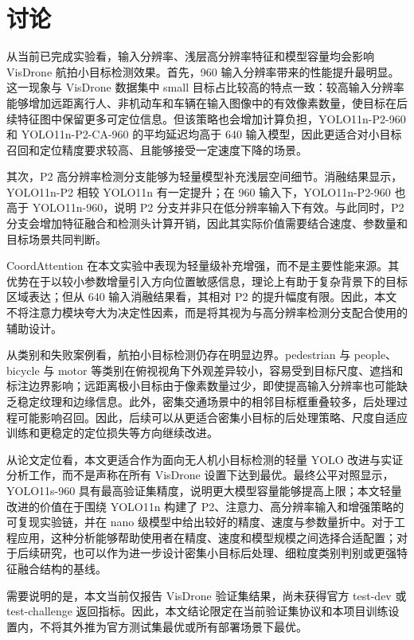 \documentclass[UTF8,a4paper,10.5pt,fontset=windows]{ctexart}
\newcommand{\YOLOBase}{\mbox{YOLO11n}}
\newcommand{\YOLOPtwo}{\mbox{YOLO11n-P2}}
\newcommand{\YOLOPtwoNine}{\mbox{YOLO11n-P2-960}}
\newcommand{\YOLOPtwoCANine}{\mbox{YOLO11n-P2-CA-960}}
\newcommand{\YOLOElevenS}{\mbox{YOLO11s}}
\newcommand{\CoordAtt}{\mbox{CoordAttention}}
\begin{document}
\FloatBarrier

\section{讨论}

从当前已完成实验看，输入分辨率、浅层高分辨率特征和模型容量均会影响 VisDrone 航拍小目标检测效果。首先，960 输入分辨率带来的性能提升最明显。这一现象与 VisDrone 数据集中 small 目标占比较高的特点一致：较高输入分辨率能够增加远距离行人、非机动车和车辆在输入图像中的有效像素数量，使目标在后续特征图中保留更多可定位信息。但该策略也会增加计算负担，\YOLOPtwoNine{} 和 \YOLOPtwoCANine{} 的平均延迟均高于 640 输入模型，因此更适合对小目标召回和定位精度要求较高、且能够接受一定速度下降的场景。

其次，P2 高分辨率检测分支能够为轻量模型补充浅层空间细节。消融结果显示，\YOLOPtwo{} 相较 \YOLOBase{} 有一定提升；在 960 输入下，\YOLOPtwoNine{} 也高于 \YOLOBase{}-960，说明 P2 分支并非只在低分辨率输入下有效。与此同时，P2 分支会增加特征融合和检测头计算开销，因此其实际价值需要结合速度、参数量和目标场景共同判断。

\CoordAtt{} 在本文实验中表现为轻量级补充增强，而不是主要性能来源。其优势在于以较小参数增量引入方向位置敏感信息，理论上有助于复杂背景下的目标区域表达；但从 640 输入消融结果看，其相对 P2 的提升幅度有限。因此，本文不将注意力模块夸大为决定性因素，而是将其视为与高分辨率检测分支配合使用的辅助设计。

从类别和失败案例看，航拍小目标检测仍存在明显边界。pedestrian 与 people、bicycle 与 motor 等类别在俯视视角下外观差异较小，容易受到目标尺度、遮挡和标注边界影响；远距离极小目标由于像素数量过少，即使提高输入分辨率也可能缺乏稳定纹理和边缘信息。此外，密集交通场景中的相邻目标框重叠较多，后处理过程可能影响召回。因此，后续可以从更适合密集小目标的后处理策略、尺度自适应训练和更稳定的定位损失等方向继续改进。

从论文定位看，本文更适合作为面向无人机小目标检测的轻量 YOLO 改进与实证分析工作，而不是声称在所有 VisDrone 设置下达到最优。最终公平对照显示，\YOLOElevenS{}-960 具有最高验证集精度，说明更大模型容量能够提高上限；本文轻量改进的价值在于围绕 \YOLOBase{} 构建了 P2、注意力、高分辨率输入和增强策略的可复现实验链，并在 nano 级模型中给出较好的精度、速度与参数量折中。对于工程应用，这种分析能够帮助使用者在精度、速度和模型规模之间选择合适配置；对于后续研究，也可以作为进一步设计密集小目标后处理、细粒度类别判别或更强特征融合结构的基线。

需要说明的是，本文当前仅报告 VisDrone 验证集结果，尚未获得官方 test-dev 或 test-challenge 返回指标。因此，本文结论限定在当前验证集协议和本项目训练设置内，不将其外推为官方测试集最优或所有部署场景下最优。
\end{document}
